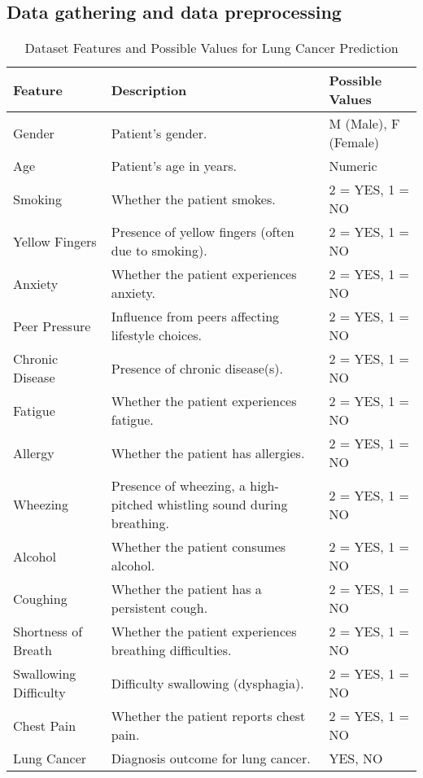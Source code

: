 \documentclass[runningheads]{llncs}
\begin{document}
\subsection{Data gathering and data preprocessing}

\begin{table}[h]
\centering
\caption{Dataset Features and Possible Values for Lung Cancer Prediction}
\label{tab:lung_cancer_features}
\begin{tabular}{|l|p{7cm}|p{2cm}|}
\hline
\textbf{Feature} & \textbf{Description} & \textbf{Possible Values} \\
\hline
Gender & Patient’s gender. & M (Male), F (Female) \\
\hline
Age & Patient’s age in years. & Numeric \\
\hline
Smoking & Whether the patient smokes. & 2 = YES, 1 = NO \\
\hline
Yellow Fingers & Presence of yellow fingers (often due to smoking). & 2 = YES, 1 = NO \\
\hline
Anxiety & Whether the patient experiences anxiety. & 2 = YES, 1 = NO \\
\hline
Peer Pressure & Influence from peers affecting lifestyle choices. & 2 = YES, 1 = NO \\
\hline
Chronic Disease & Presence of chronic disease(s). & 2 = YES, 1 = NO \\
\hline
Fatigue & Whether the patient experiences fatigue. & 2 = YES, 1 = NO \\
\hline
Allergy & Whether the patient has allergies. & 2 = YES, 1 = NO \\
\hline
Wheezing & Presence of wheezing, a high-pitched whistling sound during breathing. & 2 = YES, 1 = NO \\
\hline
Alcohol & Whether the patient consumes alcohol. & 2 = YES, 1 = NO \\
\hline
Coughing & Whether the patient has a persistent cough. & 2 = YES, 1 = NO \\
\hline
Shortness of Breath & Whether the patient experiences breathing difficulties. & 2 = YES, 1 = NO \\
\hline
Swallowing Difficulty & Difficulty swallowing (dysphagia). & 2 = YES, 1 = NO \\
\hline
Chest Pain & Whether the patient reports chest pain. & 2 = YES, 1 = NO \\
\hline
Lung Cancer & Diagnosis outcome for lung cancer. & YES, NO \\
\hline
\end{tabular}
\end{table}
\end{document}
